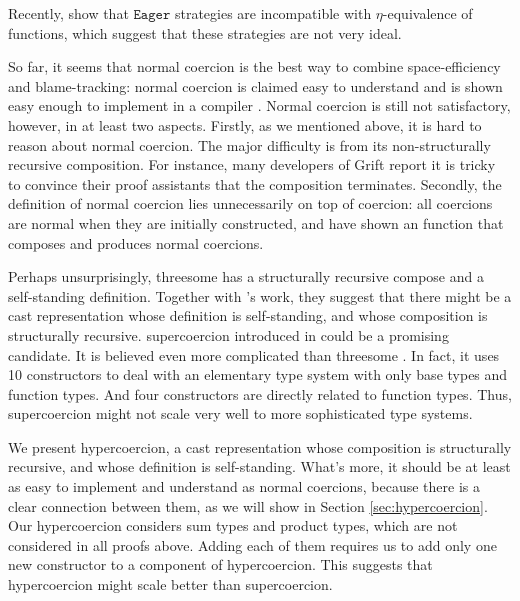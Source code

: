 \documentclass[acmsmall,review,anonymous]{acmart}\settopmatter{printfolios=true,printccs=false,printacmref=false}
\newcommand{\eager}{$\mathtt{Eager}$}
\begin{document}
Recently, \citet{new2019gradual} show that \eager{} strategies are 
incompatible with $\eta$-equivalence of functions, which suggest that these 
strategies are not very ideal. 

So far, it seems that normal coercion is the best way to combine 
space-efficiency and blame-tracking: normal coercion is claimed easy to 
understand \cite{garcia2013calculating}\cite{siek2015blame} and is shown 
easy enough to implement in a compiler \cite{kuhlenschmidt2018efficient}.
Normal coercion is still not satisfactory, however, in at least two aspects.
Firstly, as we mentioned above, it is hard to reason about normal coercion. The 
major difficulty is from its non-structurally recursive composition.
For instance, many developers of Grift report it is tricky to convince
their proof assistants that the composition terminates.
%
%
Secondly, the definition of normal coercion lies unnecessarily on top 
of coercion: all coercions are normal when they are initially constructed, and 
\citet{siek2012interpretations} have shown an function that 
composes and produces normal coercions.
%

Perhaps unsurprisingly, threesome has a structurally recursive compose and a 
self-standing definition. Together with \citet{garcia2013calculating}'s 
work, they suggest that there might be a cast representation whose definition 
is self-standing, and whose composition is structurally recursive. 
supercoercion introduced in \citet{garcia2013calculating} could be a promising 
candidate. It is believed even more complicated than threesome 
\cite{siek2015blame}. In fact, it uses 10 constructors to deal with an 
elementary type system with only base types and 
function types. And four constructors are directly related to function types. 
Thus, supercoercion might not scale very well to more sophisticated type 
systems. 

We present hypercoercion, a cast representation whose composition is 
structurally recursive, and whose definition is self-standing. What's more, it 
should be at 
least as easy to implement and understand as normal coercions, because there is 
a clear connection between them, as we will show in Section 
\ref{sec:hypercoercion}.
Our hypercoercion considers sum types and product types, which are not 
considered in all proofs above. Adding each of them requires us to add only one 
new constructor to a component of hypercoercion. This suggests that 
hypercoercion might scale better than supercoercion.
\end{document}
